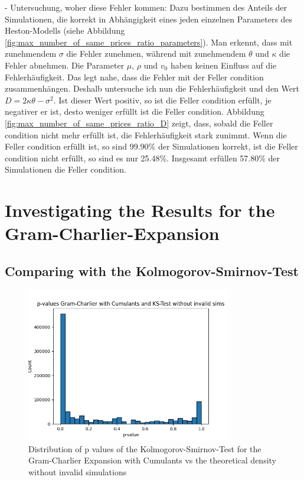 - Untersuchung, woher diese Fehler kommen: Dazu bestimmen des Anteils der Simulationen, die korrekt in Abhängigkeit eines jeden einzelnen Parameters des Heston-Modells (siehe Abbildung \ref{fig:max_number_of_same_prices_ratio_parameters}). Man erkennt, dass mit zunehmendem $\sigma$ die Fehler zunehmen, während mit zunehmendem $\theta$ und $\kappa$ die Fehler abnehmen. Die Parameter $\mu$, $\rho$ und $v_0$ haben keinen Einfluss auf die Fehlerhäufigkeit. Das legt nahe, dass die Fehler mit der Feller condition zusammenhängen. Deshalb untersuche ich nun die Fehlerhäufigkeit und den Wert $D = 2\kappa\theta - \sigma^2$. Ist dieser Wert positiv, so ist die Feller condition erfüllt, je negativer er ist, desto weniger erfüllt ist die Feller condition. Abbildung \ref{fig:max_number_of_same_prices_ratio_D} zeigt, dass, sobald die Feller condition nicht mehr erfüllt ist, die Fehlerhäufigkeit stark zunimmt. Wenn die Feller condition erfüllt ist, so sind 99.90\% der Simulationen korrekt, ist die Feller condition nicht erfüllt, so sind es nur 25.48\%. Insgesamt erfüllen 57.80\% der Simulationen die Feller condition.

\section{Investigating the Results for the Gram-Charlier-Expansion}

\subsection{Comparing with the Kolmogorov-Smirnov-Test}

\begin{figure}
    \centering
    \includegraphics[width=0.8\textwidth]{img/GC_cum_KS_p_value_histogram.png}
    \caption{Distribution of p values of the Kolmogorov-Smirnov-Test for the Gram-Charlier Expansion with Cumulants vs the theoretical density without invalid simulations}
    \label{fig:GC_cum_KS_p_value_histogram}
\end{figure}

